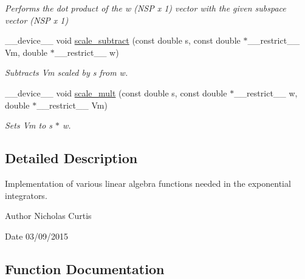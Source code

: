 \begin{DoxyCompactItemize}
\begin{DoxyCompactList}\small\item\em Performs the dot product of the w (N\+SP x 1) vector with the given subspace vector (N\+SP x 1) \end{DoxyCompactList}\item 
\+\_\+\+\_\+device\+\_\+\+\_\+ void \hyperlink{exponential__linear__algebra_8cu_a6b815eec17077505cb9313d6c380e036}{scale\+\_\+subtract} (const double s, const double $\ast$\+\_\+\+\_\+restrict\+\_\+\+\_\+ Vm, double $\ast$\+\_\+\+\_\+restrict\+\_\+\+\_\+ w)
\begin{DoxyCompactList}\small\item\em Subtracts Vm scaled by s from w. \end{DoxyCompactList}\item 
\+\_\+\+\_\+device\+\_\+\+\_\+ void \hyperlink{exponential__linear__algebra_8cu_a5349e6f114398db5a19e212fc837f670}{scale\+\_\+mult} (const double s, const double $\ast$\+\_\+\+\_\+restrict\+\_\+\+\_\+ w, double $\ast$\+\_\+\+\_\+restrict\+\_\+\+\_\+ Vm)
\begin{DoxyCompactList}\small\item\em Sets Vm to s $\ast$ w. \end{DoxyCompactList}\end{DoxyCompactItemize}


\subsection{Detailed Description}
Implementation of various linear algebra functions needed in the exponential integrators. 

\begin{DoxyAuthor}{Author}
Nicholas Curtis 
\end{DoxyAuthor}
\begin{DoxyDate}{Date}
03/09/2015 
\end{DoxyDate}


\subsection{Function Documentation}
